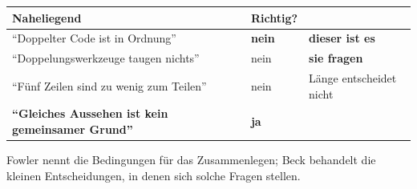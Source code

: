 \begin{warnung}
\begin{center}
\renewcommand{\arraystretch}{1.5}
\begin{tabular}{@{}P{3.2cm}P{2.2cm}P{2.4cm}@{}}
\toprule
\textbf{Naheliegend} & \textbf{Richtig?} & \\
\midrule
\enquote{Doppelter Code ist in Ordnung} & \textcolor{akzent}{\textbf{nein}} & \textcolor{akzent}{\textbf{dieser ist es}}\\
\enquote{Doppelungswerkzeuge taugen nichts} & \textcolor{akzent}{nein} & \textbf{sie fragen}\\
\enquote{Fünf Zeilen sind zu wenig zum Teilen} & \textcolor{akzent}{nein} & \textcolor{akzent}{Länge entscheidet nicht}\\
\textbf{\enquote{Gleiches Aussehen ist kein gemeinsamer Grund}} & \textcolor{gruen}{\textbf{ja}} & \\
\bottomrule
\end{tabular}
\end{center}

\begin{center}
\begin{minipage}{0.88\textwidth}
\end{minipage}
\end{center}

\begin{center}
\end{center}
\end{warnung}
\vspace{-4pt}
\noindent Fowler nennt die Be\-din\-gun\-gen für das Zu\-sam\-men\-le\-gen; Beck behandelt die kleinen Ent\-schei\-dun\-gen, in denen sich solche Fragen stellen.
